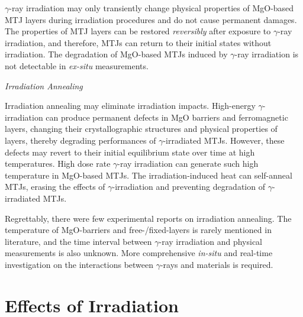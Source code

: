 \documentclass[molecules,review,submit,pdftex,moreauthors]{Definitions/mdpi}
\begin{document}
$\gamma$-ray irradiation may only transiently change physical properties of MgO-based MTJ layers during irradiation procedures and do not cause permanent damages.  The properties of MTJ layers can be restored \emph{reversibly} after exposure to $\gamma$-ray irradiation, and therefore, MTJs can return to their initial states without irradiation.  The  degradation of MgO-based MTJs induced by $\gamma$-ray irradiation is not detectable in \textit{ex-situ} measurements.   

 
\vspace{12pt}
\noindent \emph{Irradiation Annealing}
\vspace{6pt}


Irradiation annealing may eliminate irradiation impacts.  High-energy $\gamma$-irradiation can produce permanent defects in MgO barriers and ferromagnetic layers, changing their crystallographic structures and physical properties of layers, thereby degrading performances of $\gamma$-irradiated MTJs.  However, these defects may revert to their initial equilibrium state over time at high temperatures.  High dose rate $\gamma$-ray irradiation can generate such high temperature in MgO-based MTJs.  The irradiation-induced heat can self-anneal MTJs, erasing the effects of $\gamma$-irradiation and preventing degradation of $\gamma$-irradiated MTJs.  

 
Regrettably, there were few experimental reports on irradiation annealing.  The temperature of MgO-barriers and free-/fixed-layers is rarely mentioned in literature, and the time interval between $\gamma$-ray irradiation and physical measurements is also unknown. More comprehensive \textit{in-situ} and real-time investigation on the interactions between $\gamma$-rays and materials is required.  
 

\vspace{12pt}
\section{Effects of  Irradiation}

\end{document}
